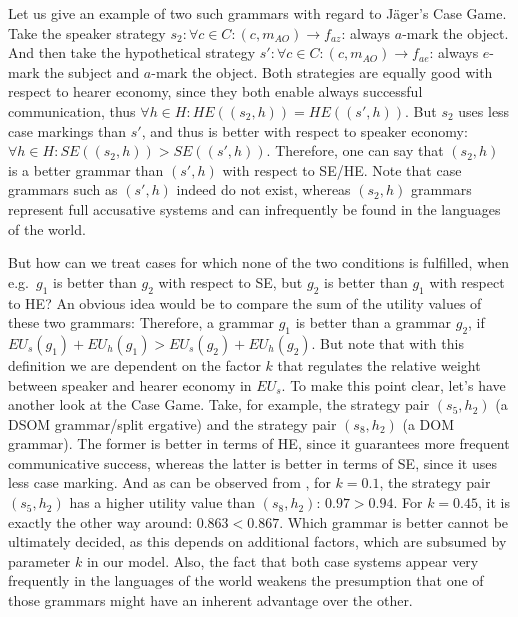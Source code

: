 \documentclass[output=paper,hidelinks]{langscibook}
\begin{document}
Let us give an example of two such grammars with regard to Jäger's Case Game. Take the speaker strategy $s_2: \forall c \in C: (c,m_{AO}) \rightarrow f_{az}$: always $a$-mark the object. And then take the hypothetical strategy $s': \forall c \in C: (c,m_{AO}) \rightarrow f_{ae}$: always $e$-mark the subject and $a$-mark the object. Both strategies are equally good with respect to hearer economy, since they both enable always successful communication, thus $\forall h \in H: HE((s_2,h)) = HE((s',h))$. But $s_2$ uses less case markings than $s'$, and thus is better with respect to speaker economy: $\forall h \in H: SE((s_2,h)) > SE((s',h))$. Therefore, one can say that $(s_2,h)$ is a better grammar than $(s',h)$ with respect to SE/HE. Note that case grammars such as $(s',h)$ indeed do not exist, whereas $(s_2,h)$ grammars represent full accusative systems and can infrequently be found in the languages of the world.

But how can we treat cases for which none of the two conditions is fulfilled, when e.g.~$g_1$ is better than $g_2$ with respect to SE, but $g_2$ is better than $g_1$ with respect to HE? An obvious idea would be to compare the sum of the utility values of these two grammars: Therefore, a grammar $g_1$ is better than a grammar $g_2$, if  $EU_s(g_1)+EU_h(g_1) > EU_s(g_2)+EU_h(g_2)$. But note that with this definition we are dependent on the factor $k$ that regulates the relative weight between speaker and hearer economy in $EU_s$. 
To make this point clear, let's have another look at the Case Game. Take, for example, the strategy pair $(s_5,h_2)$ (a DSOM grammar/split ergative)  and the strategy pair $(s_8,h_2)$ (a DOM grammar). The former is better in terms of HE, since it guarantees more frequent communicative success, whereas the latter is better in terms of SE, since it uses less case marking. And as can be observed from , for $k=0.1$, the strategy pair $(s_5,h_2)$ has a higher utility value than $(s_8,h_2)$: $0.97 > 0.94$. For $k=0.45$, it is exactly the other way around: $0.863 < 0.867$.  Which grammar is better cannot be ultimately decided, as this depends on additional factors, which are subsumed by parameter $k$ in our model. Also, the fact that both case systems appear very frequently in the languages of the world weakens the presumption that one of those grammars might have an inherent advantage over the other.
\end{document}
